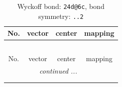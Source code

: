 \documentclass[fleqn,8pt]{jsarticle}
\begin{document}
\renewcommand{\arraystretch}{1.2}
\begin{longtable}{cccc}
\caption{Wyckoff bond: {\tt 24d@6c}, bond symmetry: {\tt ..2}}
 \\
 \hline \hline
No. & vector & center & mapping \\ \hline \endfirsthead

\multicolumn{3}{l}{\tablename\ \thetable{}} \\
 \hline \hline
No. & vector & center & mapping \\ \hline \endhead

 \hline \hline
\multicolumn{3}{r}{\footnotesize\it continued ...} \\ \endfoot

 \hline \hline
\multicolumn{3}{r}{} \\ \endlastfoot


\end{longtable}
\end{document}
